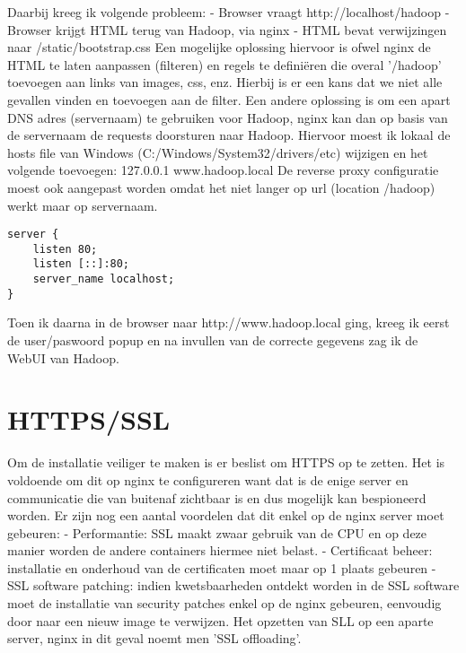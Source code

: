 Daarbij kreeg ik volgende probleem:
\newline
\newline
- Browser vraagt http://localhost/hadoop
- Browser krijgt HTML terug van Hadoop, via nginx
- HTML bevat verwijzingen naar /static/bootstrap.css
\newline
\newline
Een mogelijke oplossing hiervoor is ofwel nginx de HTML te laten aanpassen (filteren) en regels te definiëren die overal '/hadoop' toevoegen aan links van images, css, enz. Hierbij is er een kans dat we niet alle gevallen vinden en toevoegen aan de filter.
Een andere oplossing is om een apart DNS adres (servernaam) te gebruiken voor Hadoop, nginx kan dan op basis van de servernaam de requests doorsturen naar Hadoop. Hiervoor moest ik lokaal de hosts file van Windows (C:/Windows/System32/drivers/etc) wijzigen en het volgende toevoegen:
127.0.0.1 www.hadoop.local
\newline
\newline
De reverse proxy configuratie moest ook aangepast worden omdat het niet langer op url (location /hadoop) werkt maar op servernaam.
\newline
\newline
\begin{lstlisting}
server {
    listen 80;
    listen [::]:80;
    server_name localhost;
}
\end{lstlisting}

Toen ik daarna in de browser naar http://www.hadoop.local ging, kreeg ik eerst de user/paswoord popup en na invullen van de correcte gegevens zag ik de WebUI van Hadoop.

\section{HTTPS/SSL}

Om de installatie veiliger te maken is er beslist om HTTPS op te zetten. Het is voldoende om dit op nginx te configureren want dat is de enige server en communicatie die van buitenaf zichtbaar is en dus mogelijk kan bespioneerd worden. Er zijn nog een aantal voordelen dat dit enkel op de nginx server moet gebeuren:
\newline
\newline
- Performantie: SSL maakt zwaar gebruik van de CPU en op deze manier worden de andere containers hiermee niet belast.
- Certificaat beheer: installatie en onderhoud van de certificaten moet maar op 1 plaats gebeuren
- SSL software patching: indien kwetsbaarheden ontdekt worden in de SSL software moet de installatie van security patches enkel op de nginx gebeuren, eenvoudig door naar een nieuw image te verwijzen.
\newline
\newline
Het opzetten van SLL op een aparte server, nginx in dit geval noemt men 'SSL offloading'.

